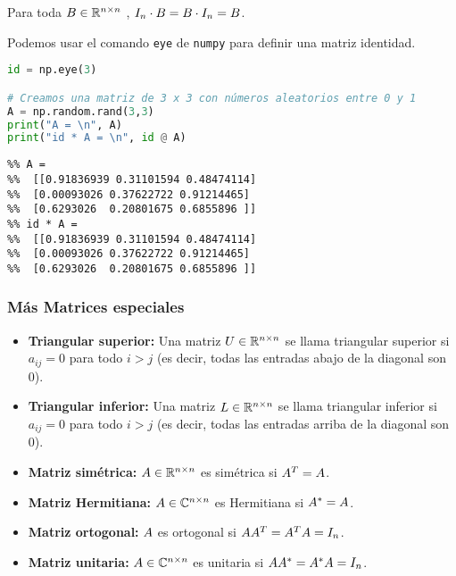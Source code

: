 \begin{proposicion}
Para toda $\Bb \in \R^{n \times n}$ , $I_n \cdot \Bb = \Bb \cdot I_n = \Bb$.
\end{proposicion}

Podemos usar el comando \texttt{eye} de \texttt{numpy} para definir una matriz identidad.

\begin{Shaded}
\begin{lstlisting}[language=Python]
id = np.eye(3)

# Creamos una matriz de 3 x 3 con números aleatorios entre 0 y 1
A = np.random.rand(3,3)
print("A = \n", A)
print("id * A = \n", id @ A)
\end{lstlisting}
\end{Shaded}

\begin{verbatim}
%% A =
%%  [[0.91836939 0.31101594 0.48474114]
%%  [0.00093026 0.37622722 0.91214465]
%%  [0.6293026  0.20801675 0.6855896 ]]
%% id * A =
%%  [[0.91836939 0.31101594 0.48474114]
%%  [0.00093026 0.37622722 0.91214465]
%%  [0.6293026  0.20801675 0.6855896 ]]
\end{verbatim}

\subsubsection{Más Matrices especiales}

\begin{itemize}
\item \textbf{Triangular superior:} Una matriz $\Ub \in \R^{n \times n}$ se llama triangular superior si $a_{ij} = 0$ para todo $i > j$ (es decir, todas las entradas abajo de la diagonal son 0).
\item \textbf{Triangular inferior:} Una matriz $\Lb \in \R^{n \times n}$ se llama triangular inferior si $a_{ij} = 0$ para todo $i > j$ (es decir, todas las entradas arriba de la diagonal son 0).
\item \textbf{Matriz simétrica:} $\Ab\in \R^{n\times n}$ es simétrica si $\Ab^T = \Ab$.
\item \textbf{Matriz Hermitiana:} $\Ab\in \C^{n\times n}$ es Hermitiana si $\Ab^* = \Ab$.
\item \textbf{Matriz ortogonal:} $\Ab$ es ortogonal si $\Ab\Ab^T = \Ab^T\Ab = \Id_n$.
\item \textbf{Matriz unitaria:} $\Ab\in \C^{n\times n}$ es unitaria si $\Ab\Ab^* = \Ab^*\Ab = \Id_n$.
\end{itemize}

